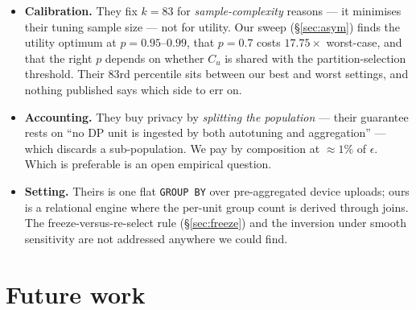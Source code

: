 \documentclass[11pt,a4paper]{article}
\newcommand{\Cu}{C_u}
\begin{document}
\begin{itemize}
\item \textbf{Calibration.} They fix $k = 83$ for \emph{sample-complexity} reasons --- it minimises
their tuning sample size --- not for utility. Our sweep (\S\ref{sec:asym}) finds the utility optimum
at $p = 0.95$--$0.99$, that $p = 0.7$ costs $17.75\times$ worst-case, and that the right $p$ depends
on whether $\Cu$ is shared with the partition-selection threshold. Their 83rd percentile sits
between our best and worst settings, and nothing published says which side to err on.
\item \textbf{Accounting.} They buy privacy by \emph{splitting the population} --- their guarantee
rests on ``no DP unit is ingested by both autotuning and aggregation'' --- which discards a
sub-population. We pay by composition at $\approx1\%$ of $\epsilon$. Which is preferable is an open
empirical question.
\item \textbf{Setting.} Theirs is one flat \texttt{GROUP BY} over pre-aggregated device uploads;
ours is a relational engine where the per-unit group count is derived through joins. The
freeze-versus-re-select rule (\S\ref{sec:freeze}) and the inversion under smooth sensitivity are
not addressed anywhere we could find.
\end{itemize}

\section{Future work}
\end{document}
